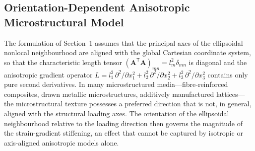 \documentclass[final,3p,times,fleqn]{elsarticle}
\begin{document}

\subsection{Orientation-Dependent Anisotropic Microstructural Model}
\label{sec:3D_orientation_model}

The formulation of Section~1 assumes that the
principal axes of the ellipsoidal nonlocal neighbourhood are aligned
with the global Cartesian coordinate system, so that the characteristic
length tensor $(\mathbf{A}^{\mathsf{T}}\mathbf{A})_{mn} = l_{m}^{2}
\delta_{mn}$ is diagonal and the anisotropic gradient operator
$L = l_{1}^{2}\,\partial^{2}/\partial x_{1}^{2}
  + l_{2}^{2}\,\partial^{2}/\partial x_{2}^{2}
  + l_{3}^{2}\,\partial^{2}/\partial x_{3}^{2}$
contains only pure second derivatives.
In many microstructured media---fibre-reinforced composites, drawn
metallic microstructures, additively manufactured lattices---the
microstructural texture possesses a preferred direction that is not,
in general, aligned with the structural loading axes.
The orientation of the ellipsoidal neighbourhood relative to the
loading direction then governs the magnitude of the strain-gradient
stiffening, an effect that cannot be captured by isotropic or
axis-aligned anisotropic models alone.
\end{document}
